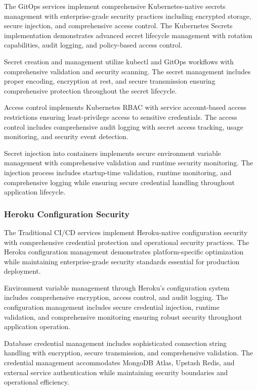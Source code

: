 The GitOps services implement comprehensive Kubernetes-native secrets management with enterprise-grade security practices including encrypted storage, secure injection, and comprehensive access control. The Kubernetes Secrets implementation demonstrates advanced secret lifecycle management with rotation capabilities, audit logging, and policy-based access control.

Secret creation and management utilize kubectl and GitOps workflows with comprehensive validation and security scanning. The secret management includes proper encoding, encryption at rest, and secure transmission ensuring comprehensive protection throughout the secret lifecycle.

Access control implements Kubernetes RBAC with service account-based access restrictions ensuring least-privilege access to sensitive credentials. The access control includes comprehensive audit logging with secret access tracking, usage monitoring, and security event detection.

Secret injection into containers implements secure environment variable management with comprehensive validation and runtime security monitoring. The injection process includes startup-time validation, runtime monitoring, and comprehensive logging while ensuring secure credential handling throughout application lifecycle.

\subsubsection{Heroku Configuration Security}

The Traditional CI/CD services implement Heroku-native configuration security with comprehensive credential protection and operational security practices. The Heroku configuration management demonstrates platform-specific optimization while maintaining enterprise-grade security standards essential for production deployment.

Environment variable management through Heroku's configuration system includes comprehensive encryption, access control, and audit logging. The configuration management includes secure credential injection, runtime validation, and comprehensive monitoring ensuring robust security throughout application operation.

Database credential management includes sophisticated connection string handling with encryption, secure transmission, and comprehensive validation. The credential management accommodates MongoDB Atlas, Upstash Redis, and external service authentication while maintaining security boundaries and operational efficiency.

